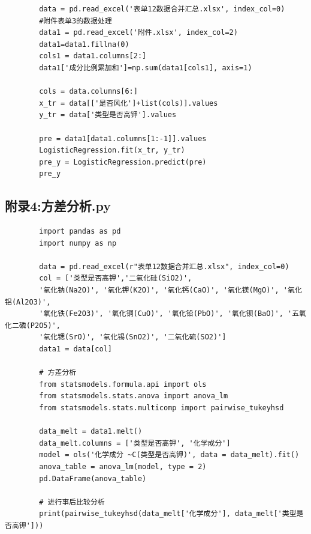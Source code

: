 \documentclass[withoutpreface,bwprint]{cumcmthesis}%
\begin{document}
\begin{appendices}
\begin{lstlisting}
		data = pd.read_excel('表单12数据合并汇总.xlsx', index_col=0)
		#附件表单3的数据处理
		data1 = pd.read_excel('附件.xlsx', index_col=2)
		data1=data1.fillna(0)
		cols1 = data1.columns[2:]
		data1['成分比例累加和']=np.sum(data1[cols1], axis=1)
		
		cols = data.columns[6:]
		x_tr = data[['是否风化']+list(cols)].values
		y_tr = data['类型是否高钾'].values
		
		pre = data1[data1.columns[1:-1]].values
		LogisticRegression.fit(x_tr, y_tr)
		pre_y = LogisticRegression.predict(pre)
		pre_y
	\end{lstlisting}	

	\subsection{附录4:方差分析.py}
	\begin{lstlisting}
		import pandas as pd
		import numpy as np
		
		data = pd.read_excel(r"表单12数据合并汇总.xlsx", index_col=0)
		col = ['类型是否高钾','二氧化硅(SiO2)',
		'氧化钠(Na2O)', '氧化钾(K2O)', '氧化钙(CaO)', '氧化镁(MgO)', '氧化铝(Al2O3)',
		'氧化铁(Fe2O3)', '氧化铜(CuO)', '氧化铅(PbO)', '氧化钡(BaO)', '五氧化二磷(P2O5)',
		'氧化锶(SrO)', '氧化锡(SnO2)', '二氧化硫(SO2)']
		data1 = data[col]
		
		# 方差分析
		from statsmodels.formula.api import ols
		from statsmodels.stats.anova import anova_lm
		from statsmodels.stats.multicomp import pairwise_tukeyhsd
		
		data_melt = data1.melt()
		data_melt.columns = ['类型是否高钾', '化学成分']
		model = ols('化学成分 ~C(类型是否高钾)', data = data_melt).fit()
		anova_table = anova_lm(model, type = 2)
		pd.DataFrame(anova_table)
		
		# 进行事后比较分析
		print(pairwise_tukeyhsd(data_melt['化学成分'], data_melt['类型是否高钾']))
	\end{lstlisting}	
	\end{appendices}
\end{document}
